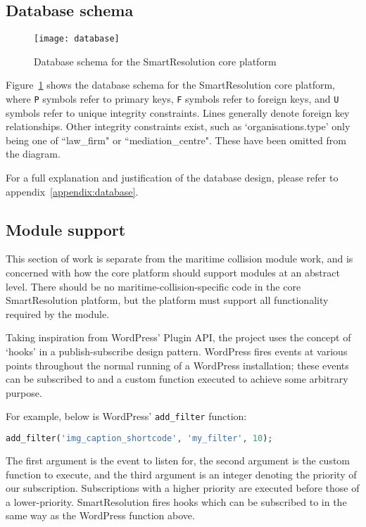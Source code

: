 \subsection{Database schema}

\begin{figure}[h!]
  \centering
    \ifimages
    \texttt{[image: database]}
    \fi
  \caption{Database schema for the SmartResolution core platform}
  \label{uml:databaseSchema}
\end{figure}

Figure~\ref{uml:databaseSchema} shows the database schema for the SmartResolution core platform, where \lstinline{P} symbols refer to primary keys, \lstinline{F} symbols refer to foreign keys, and \lstinline{U} symbols refer to unique integrity constraints. Lines generally denote foreign key relationships. Other integrity constraints exist, such as `organisations.type' only being one of ``law\_firm" or ``mediation\_centre". These have been omitted from the diagram.

For a full explanation and justification of the database design, please refer to appendix~\ref{appendix:database}.

\subsection{Module support}\label{subsection:moduleSupport}

This section of work is separate from the maritime collision module work, and is concerned with how the core platform should support modules at an abstract level. There should be no maritime-collision-specific code in the core SmartResolution platform, but the platform must support all functionality required by the module.

Taking inspiration from WordPress' Plugin API, the project uses the concept of `hooks' in a publish-subscribe design pattern. WordPress fires events at various points throughout the normal running of a WordPress installation; these events can be subscribed to and a custom function executed to achieve some arbitrary purpose.

For example, below is WordPress' \lstinline{add_filter} function:

\begin{lstlisting}[language=php]
add_filter('img_caption_shortcode', 'my_filter', 10);
\end{lstlisting}

The first argument is the event to listen for, the second argument is the custom function to execute, and the third argument is an integer denoting the priority of our subscription. Subscriptions with a higher priority are executed before those of a lower-priority. SmartResolution fires hooks which can be subscribed to in the same way as the WordPress function above.

